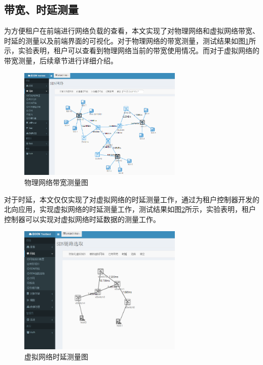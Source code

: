 \subsection{带宽、时延测量}
为方便租户在前端进行网络负载的查看，本文实现了对物理网络和虚拟网络带宽、时延的测量以及前端界面的可视化。对于物理网络的带宽测量，测试结果如图\ref{fig:bandwidth}所示，实验表明，租户可以查看到物理网络当前的带宽使用情况。而对于虚拟网络的带宽测量，后续章节进行详细介绍。

\begin{figure}[!htb]
  \centering
  \includegraphics[width=0.7\textwidth,height=0.50\textwidth]{logo/bandwidth.png}
  \caption{物理网络带宽测量图}
  \label{fig:bandwidth}
\end{figure}

对于时延，本文仅仅实现了对虚拟网络的时延测量工作，通过为租户控制器开发的北向应用，实现虚拟网络的时延测量工作，测试结果如图\ref{fig:delay}所示，实验表明，租户控制器可以实现对虚拟网络时延数据的测量工作。

\begin{figure}[!htb]
  \centering
  \includegraphics[width=0.7\textwidth,height=0.50\textwidth]{logo/virtualdelay.png}
  \caption{虚拟网络时延测量图}
  \label{fig:delay}
\end{figure}
